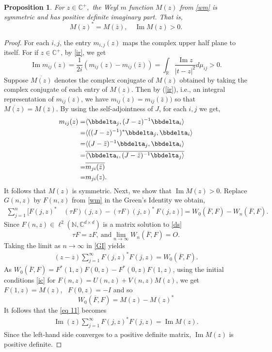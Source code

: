 \documentclass[reqno]{amsart}
\numberwithin{equation}{section}
\newcommand{\C}{\mathbb{C}}
\newcommand{\R}{\mathbb{R}}
\newcommand{\N}{\mathbb{N}}
\newtheorem{prop}{Proposition}[section]
\newcommand{\ip}[2]
      {\ensuremath{\langle #1,#2 \rangle}}
\begin{document}
	\begin{prop} \cite{KA2} For $z\in \C^+,$ the Weyl $m$ function $M(z)$ from \eqref{wm} is symmetric and has positive definite imaginary part. That is,  $$M(z)^*= M(\bar{z}), \quad \operatorname {Im}M(z)> 0.$$ \end{prop}	
	
	\begin{proof}   For each $i, j$,  the entry $m_{i,j}(z)$ maps the complex upper half plane to itself. For if $ z \in \C^+$, by \eqref{ir}, we get
    $$ 
    \operatorname{Im} m_{ij}(z)= \frac{1}{2i}(  m_{ij}(z) - m_{ij}( \bar{z})) = \int_{\R} \frac{\operatorname{Im} z }{|t-z|^2}d\mu_{ij}  > 0 .
    $$
 Suppose $\overline{M(z)}$ denotes the complex conjugate of $M(z)$ obtained by taking the complex conjugate of each entry of $ M(z) $. Then by (\ref{ir}), i.e., an integral representation of $ m_{ij}(z)$, we have $ \overline{ m_{ij}(z) } = m_{ij}( \bar{z}))$ so that   $ \overline{M(z)} = M(\bar{z})$. By using the self-adjointness of $J$, for each $i,j $	we get,	
	\begin{align*} 
    m_{ij}(z) = & \ip{\bbdelta_j }{(J-z)^{-1}\bbdelta_i} \\ = & \ip{ ( (J-z)^{-1})^* \bbdelta_j}{\bbdelta_i} \\ = &  \ip{ (J-\bar{z})^{-1}\bbdelta_j}{\bbdelta_i} \\  
 = & \overline{\ip{\bbdelta_i}{(J-\bar{z})^{-1}\bbdelta_j} }\\	 
			= & \overline{m_{ji}(\bar{z})}\\
			= & m_{ji}(z) .
            \end{align*}
It follows that $M(z)$ is symmetric. Next, we show that $\operatorname{Im} M(z) >0 .$ Replace $G(n,z)$ by $F(n,z)$ from \eqref{wm}  in the Green's Identity we obtain,
   \begin{align} \label{GI}
\sum_{j=1}^{n}  [ F(j, z)^* \, & (\tau F)(j, z) -  (\tau F)(j, z)^* \, F(j, z)  ] = W_0(\overline{F}, F) - W_n(\overline{F}, F).
\end{align} 
Since $F(n,z) \in \ell^2(\N, \C^{d\times d} ) $ is a matrix solution to \eqref{ds} $$\tau F =zF, \  \text{and}  \displaystyle \lim_{n\rightarrow \infty} W_n( \overline F, F)= O .$$
Taking the limit as $ n\rightarrow \infty $ in \eqref{GI} yields	 \begin{align} \label{eq 11}
(z- \overline{z})\sum_{j=1}^{\infty}    F(j, z)^*  F(j, z)   = W_0(\overline{F}, F).
\end{align} 	
 As  $ W_0(\overline{F}, F) =  F^{*}(1, z)F(0,z)-  F^{*}(0,z) F(1,z) $,  using the initial conditions \eqref{ic} for $F(n,z) = U(n,z) +V(n,z)M(z)$, we get $F(1,z) = M(z)$, \ $F(0,z)= -I$ and so $$  W_0(\overline{F}, F) = M(z) -M(z)^*$$
 It follows that the \eqref{eq 11} becomes
\begin{align} \label{eq 12}
\operatorname{Im} (z)\sum_{j=1}^{\infty}    F(j, z)^*  F(j, z)   = \operatorname{Im}M(z).
\end{align}
Since the left-hand side converges to a positive definite matrix, $\operatorname{Im}M(z)$ is positive definite.

\end{proof}
\end{document}
